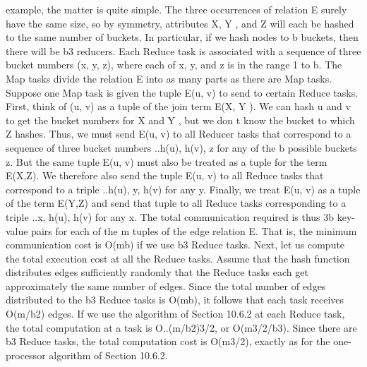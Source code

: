 \documentclass[paper=a4, fontsize=11pt]{scrartcl}	%
\numberwithin{equation}{section}															%
\numberwithin{figure}{section}																%
\numberwithin{table}{section}																%
\begin{document}
example, the matter is quite simple. The three occurrences of relation E surely
have the same size, so by symmetry, attributes X, Y , and Z will each be hashed
to the same number of buckets. In particular, if we hash nodes to b buckets,
then there will be b3 reducers. Each Reduce task is associated with a sequence
of three bucket numbers (x, y, z), where each of x, y, and z is in the range 1 to
b.
The Map tasks divide the relation E into as many parts as there are Map
tasks. Suppose one Map task is given the tuple E(u, v) to send to certain
Reduce tasks. First, think of (u, v) as a tuple of the join term E(X, Y ). We
can hash u and v to get the bucket numbers for X and Y , but we don t know
the bucket to which Z hashes. Thus, we must send E(u, v) to all Reducer tasks
that correspond to a sequence of three bucket numbers ..h(u), h(v), z for any
of the b possible buckets z.
But the same tuple E(u, v) must also be treated as a tuple for the term
E(X,Z). We therefore also send the tuple E(u, v) to all Reduce tasks that
correspond to a triple ..h(u), y, h(v) for any y. Finally, we treat E(u, v) as a
tuple of the term E(Y,Z) and send that tuple to all Reduce tasks corresponding
to a triple ..x, h(u), h(v) for any x. The total communication required is thus
3b key-value pairs for each of the m tuples of the edge relation E. That is, the
minimum communication cost is O(mb) if we use b3 Reduce tasks.
Next, let us compute the total execution cost at all the Reduce tasks. Assume
that the hash function distributes edges sufficiently randomly that the
Reduce tasks each get approximately the same number of edges. Since the total
number of edges distributed to the b3 Reduce tasks is O(mb), it follows that each
task receives O(m/b2) edges. If we use the algorithm of Section 10.6.2 at each
Reduce task, the total computation at a task is O..(m/b2)3/2, or O(m3/2/b3).
Since there are b3 Reduce tasks, the total computation cost is O(m3/2), exactly
as for the one-processor algorithm of Section 10.6.2.\\
\end{document}
